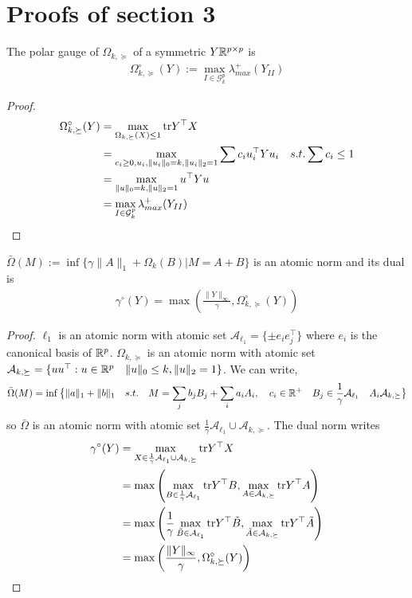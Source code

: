 \documentclass{article}
\begin{document}
\newpage
\section{Proofs of section 3}

\begin{lemma} The polar gauge of $\Omega_{k,\succeq}$ of a symmetric $Y\mathbb{R}^{p\times p}$ is
\begin{align}
\Omega_{k,\succeq}^{\circ}(Y):= \max_{I\in\mathcal{G}^p_k}\lambda^{+}_{max}(Y_{II})
\end{align}
\end{lemma}

\begin{proof}
\begin{align}
\Omega_{k,\succeq}^{\circ}(Y) 
&=\max_{\Omega_{k,\succeq}(X)\leq 1} {\rm tr}{Y^{\top}X}\\
&=\max_{c_i\geq 0, u_{i}, \|u_{i}\|_0=k, \|u_{i}\|_ 2=1 } \sum c_i u_{i}^{\top}Yu_{i} \quad s.t.  \sum c_i\leq 1\\
&=\max_{\|u\|_0=k, \|u\|_ 2=1 } u^{\top}Yu \\
&=\max_{I\in\mathcal{G}^p_k}\lambda^{+}_{max}(Y_{II})
\end{align}
\end{proof}

\begin{lemma} $\bar{\Omega}(M):=\inf\{\gamma\|A\|_{1}+\Omega_k(B)|M=A+B\}$ is an atomic norm and its dual is 
\begin{align*}
\gamma^{\circ}(Y)=\max\left(\frac{\|Y\|_{\infty}}{\gamma},\Omega_{k,\succeq}^{\circ}(Y)\right)
\end{align*}
\end{lemma}

\begin{proof}
$\ell_1$ is an atomic norm with atomic set $\mathcal{A}_{\ell_{1}}=\{\pm e_i e_j^{\top}\}$ where $e_i$ is the canonical basis of $\mathbb{R}^p$. $\Omega_{k,\succeq}$  is an atomic norm with atomic set $\mathcal{A}_{k,\succeq}=\{uu^{\top}  :  u\in\mathbb{R}^{p} \quad \|u\|_0 \leq k, \|u\|_2 = 1\}$. We can write,
$$
\bar{\Omega}(M)= \inf \big\{\|a\|_1+\|b\|_1 \quad s.t. \quad M=\sum_{j} b_j B_{j} + \sum_{i} a_i A_{i}, \quad c_i\in \mathbb{R}^{+}\quad B_j\in\frac{1}{\gamma}\mathcal{A}_{\ell_{1}} \quad A_i\mathcal{A}_{k,\succeq} \big\}
$$
so $\bar{\Omega}$ is an atomic norm with atomic set $\frac{1}{\gamma}\mathcal{A}_{\ell_{1}}\cup\mathcal{A}_{k,\succeq}$. The dual norm writes
\begin{align}
\gamma^{\circ}(Y)
& = \max_{X\in\frac{1}{\gamma}\mathcal{A}_{\ell_{1}}\cup\mathcal{A}_{k,\succeq}} {\rm tr}{Y^{\top}X}\\
& =\max\left(\max_{B\in\frac{1}{\gamma}\mathcal{A}_{\ell_{1}}}{\rm tr}{Y^{\top}B}, \max_{A\in\mathcal{A}_{k,\succeq}}{\rm tr}{Y^{\top}A}\right)\\
& =\max\left(\frac{1}{\gamma}\max_{\tilde{B}\in\mathcal{A}_{\ell_{1}}}{\rm tr}{Y^{\top}\tilde{B}}, \max_{\tilde{A}\in\mathcal{A}_{k,\succeq}}{\rm tr}{Y^{\top}\tilde{A}}\right)\\
& =\max\left(\frac{\|Y\|_{\infty}}{\gamma},\Omega_{k,\succeq}^{\circ}(Y)\right)
\end{align}
%
%
\end{proof}
\end{document}

